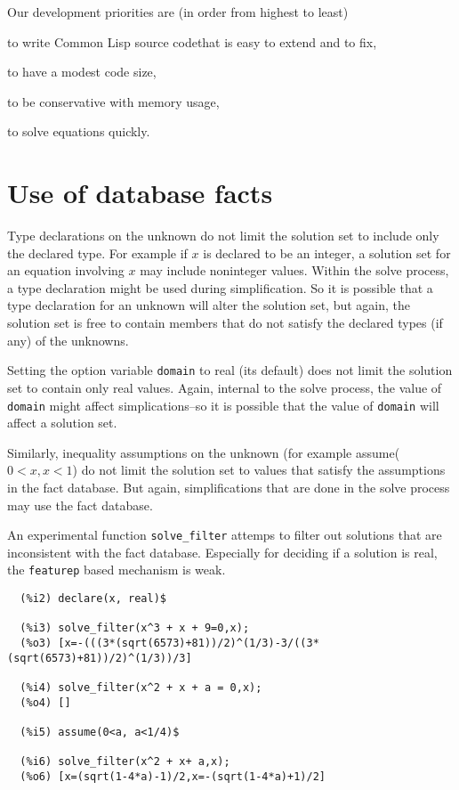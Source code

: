 \documentclass[]{scrartcl}
\begin{document}
Our development priorities are (in order from highest to least)

\begin{alphalist}[]

\item to write  Common Lisp source codethat is easy to extend and to fix,

\item to have a modest code size,

\item to be conservative with memory usage,

\item to solve equations quickly.

\end{alphalist}


\section{Use of database facts}

Type declarations on the unknown do not limit the solution set to include only the declared type. For
example if \(x\) is declared to be an integer, a solution set for an equation involving \(x\) may include
noninteger values. Within the solve process, a type declaration might be used during simplification. So it is possible that a type declaration for an unknown will alter the solution set, but again, the solution set is free to contain members that do not satisfy the declared types (if any) of the unknowns.

Setting the option variable \texttt{domain} to real (its default) does not limit the solution set to contain only real values. Again, internal to the solve process, the value of \texttt{domain} might affect simplications--so it is possible that the value of \texttt{domain} will affect a solution set.

Similarly, inequality assumptions on the unknown (for example assume( \(0 < x, x < 1\)) do not limit the solution set to values that satisfy the assumptions in the fact database. But again, simplifications that are done in the solve process may use the fact database.

An experimental function \texttt{solve\_filter} attemps to filter out solutions that are inconsistent with the fact database. Especially for deciding if a solution is real, the \texttt{featurep} based mechanism is weak.

\begin{verbatim}
  (%i2)	declare(x, real)$

  (%i3)	solve_filter(x^3 + x + 9=0,x);
  (%o3)	[x=-(((3*(sqrt(6573)+81))/2)^(1/3)-3/((3*(sqrt(6573)+81))/2)^(1/3))/3]

  (%i4)	solve_filter(x^2 + x + a = 0,x);
  (%o4)	[]

  (%i5)	assume(0<a, a<1/4)$

  (%i6)	solve_filter(x^2 + x+ a,x);
  (%o6)	[x=(sqrt(1-4*a)-1)/2,x=-(sqrt(1-4*a)+1)/2]
\end{verbatim}
\end{document}
